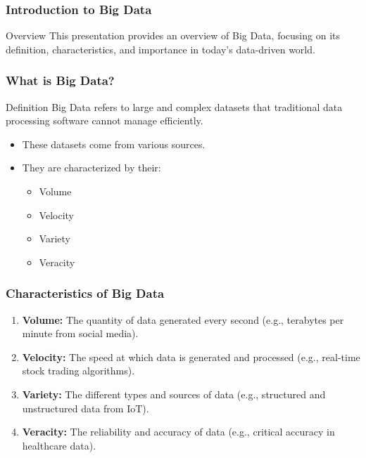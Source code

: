 \documentclass[aspectratio=169]{beamer}
\begin{document}
\frame{\titlepage}

\begin{frame}[fragile]
    \frametitle{Introduction to Big Data}
    \begin{block}{Overview}
        This presentation provides an overview of Big Data, focusing on its definition, characteristics, and importance in today’s data-driven world.
    \end{block}
\end{frame}

\begin{frame}[fragile]
    \frametitle{What is Big Data?}
    \begin{block}{Definition}
        Big Data refers to large and complex datasets that traditional data processing software cannot manage efficiently.
    \end{block}
    \begin{itemize}
        \item These datasets come from various sources.
        \item They are characterized by their:
            \begin{itemize}
                \item Volume
                \item Velocity
                \item Variety
                \item Veracity
            \end{itemize}
    \end{itemize}
\end{frame}

\begin{frame}[fragile]
    \frametitle{Characteristics of Big Data}
    \begin{enumerate}
        \item \textbf{Volume:} The quantity of data generated every second (e.g., terabytes per minute from social media).
        \item \textbf{Velocity:} The speed at which data is generated and processed (e.g., real-time stock trading algorithms).
        \item \textbf{Variety:} The different types and sources of data (e.g., structured and unstructured data from IoT).
        \item \textbf{Veracity:} The reliability and accuracy of data (e.g., critical accuracy in healthcare data).
    \end{enumerate}
\end{frame}
\end{document}
